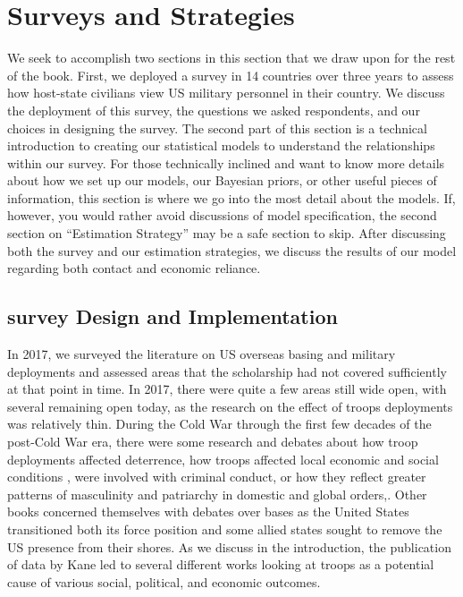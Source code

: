 \section*{Surveys and Strategies}

We seek to accomplish two sections in this section that we draw upon for the rest of the book. First, we deployed a survey in 14 countries over three years to assess how host-state civilians view US military personnel in their country. We discuss the deployment of this survey, the questions we asked respondents, and our choices in designing the survey. The second part of this section is a technical introduction to creating our statistical models to understand the relationships within our survey. For those technically inclined and want to know more details about how we set up our models, our Bayesian priors, or other useful pieces of information, this section is where we go into the most detail about the models. If, however, you would rather avoid discussions of model specification, the second section on ``Estimation Strategy'' may be a safe section to skip. After discussing both the survey and our estimation strategies, we discuss the results of our model regarding both contact and economic reliance. 


\subsection*{survey Design and Implementation}

In 2017, we surveyed the literature on US overseas basing and military deployments and assessed areas that the scholarship had not covered sufficiently at that point in time. In 2017, there were quite a few areas still wide open, with several remaining open today, as the research on the effect of troops deployments was relatively thin. During the Cold War through the first few decades of the post-Cold War era, there were some research and debates about how troop deployments affected deterrence,\cite{Schelling1966} how troops affected local economic and social conditions \cite{Moon1997}, were involved with criminal conduct,\cite{Bryant1979} or how they reflect greater patterns of masculinity and patriarchy in domestic and global orders,\cite{Enloe1990}. Other books concerned themselves with debates over bases as the United States transitioned both its force position and some allied states sought to remove the US presence from their shores.\cite{calder2007,Cooley2008,Yeo2011} As we discuss in the introduction, the publication of data by Kane led to several different works looking at troops as a potential cause of various social, political, and economic outcomes.\cite{Kane2004} 



